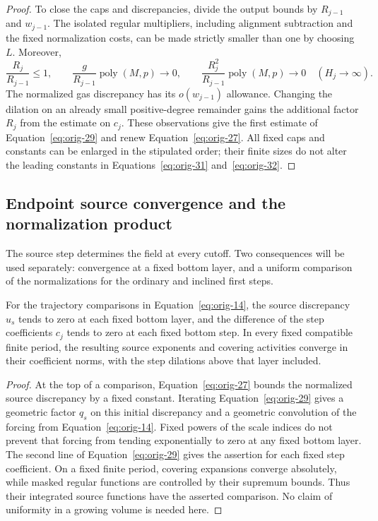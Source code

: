\begin{proof}
To close the caps and discrepancies, divide the output bounds
by $R_{j-1}$ and $w_{j-1}$.  The isolated regular multipliers,
including alignment subtraction and the fixed normalization
costs, can be made strictly smaller than one by choosing $L$.
Moreover,
\[
 \frac{R_j}{R_{j-1}}\le1,
 \qquad
 \frac{g}{R_{j-1}}\operatorname{poly}(M,p)\longrightarrow0,
 \qquad
 \frac{R_j^2}{R_{j-1}}\operatorname{poly}(M,p)\longrightarrow0
 \quad(H_j\to\infty).
\]
The normalized gas discrepancy has its $o(w_{j-1})$ allowance.
Changing the dilation on an already small positive-degree
remainder gains the additional factor $R_j$ from the estimate
on $c_j$.  These observations give the first estimate of
Equation~\eqref{eq:orig-29} and renew
Equation~\eqref{eq:orig-27}.  All fixed caps and constants can
be enlarged in the stipulated order; their finite sizes do not
alter the leading constants in
Equations~\eqref{eq:orig-31} and~\eqref{eq:orig-32}.
\end{proof}

\subsection{Endpoint source convergence and the normalization product}

The source step determines the field at every cutoff.  Two
consequences will be used separately: convergence at a fixed
bottom layer, and a uniform comparison of the normalizations
for the ordinary and inclined first steps.

\begin{corollary}
\label{cor:source-endpoints}
For the trajectory comparisons in Equation~\eqref{eq:orig-14},
the source discrepancy $u_s$ tends to zero at each fixed bottom
layer, and the difference of the step coefficients $c_j$ tends
to zero at each fixed bottom step.  In every fixed compatible
finite period, the resulting source exponents and covering
activities converge in their coefficient norms, with the step
dilations above that layer included.
\end{corollary}

\begin{proof}
At the top of a comparison, Equation~\eqref{eq:orig-27} bounds
the normalized source discrepancy by a fixed constant.
Iterating Equation~\eqref{eq:orig-29} gives a geometric factor
$q_s$ on this initial discrepancy and a geometric convolution
of the forcing from Equation~\eqref{eq:orig-14}.  Fixed powers
of the scale indices do not prevent that forcing from tending
exponentially to zero at any fixed bottom layer.  The second
line of Equation~\eqref{eq:orig-29} gives the assertion for
each fixed step coefficient.  On a fixed finite period,
covering expansions converge absolutely, while masked regular
functions are controlled by their supremum bounds.  Thus their
integrated source functions have the asserted comparison.
No claim of uniformity in a growing volume is needed here.
\end{proof}

